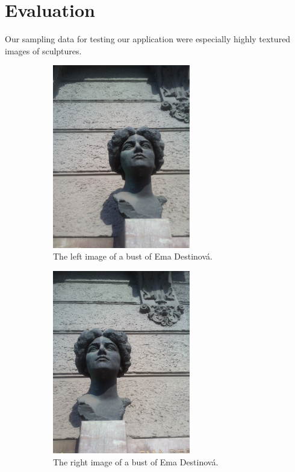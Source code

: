\chapter{Evaluation}
\label{chap:eval}

Our sampling data for testing our application were especially highly textured images of sculptures.



\begin{figure}[H]
\centering

\begin{subfigure}[b]{0.45\textwidth}
\centering
\includegraphics[width=6.0cm]{img/ema_a.png}
\caption{The left image of a bust of Ema Destinová.} \label{0}
\end{subfigure}
\begin{subfigure}[b]{0.45\textwidth}
\centering
\includegraphics[width=6.0cm]{img/ema_b.png}
\caption{The right image of a bust of Ema Destinová.} \label{2}
\end{subfigure}
\begin{subfigure}[b]{0.45\textwidth}

\end{subfigure}
\end{figure}
